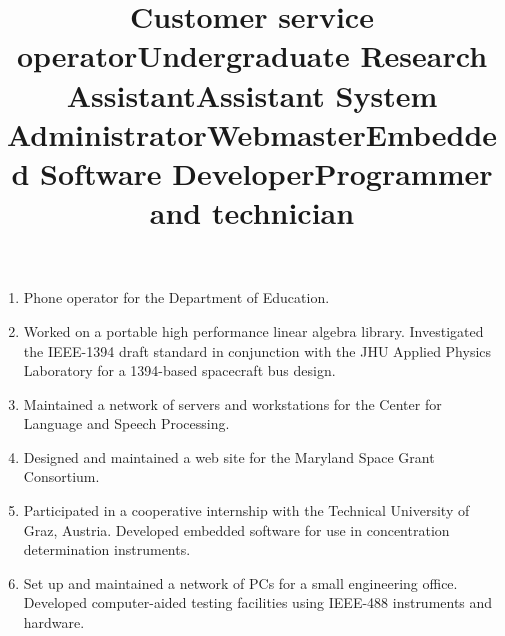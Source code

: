 \documentclass[line]{res}
\begin{document}
\begin{resume}
\begin{enumerate}
		\item {} 
		\title{Customer service operator} 
		  
		\begin{position}
			Phone operator for the Department of Education. 
		\end{position}
		
		\item {} 
		\title{Undergraduate Research Assistant} 
		  
		\begin{position}
			Worked on a portable high performance linear algebra library. Investigated the IEEE-1394 draft standard in conjunction with the JHU Applied Physics Laboratory for a 1394-based spacecraft bus design. 
		\end{position}
		
		\item 
		\title{Assistant System Administrator} 
		\begin{position}
			Maintained a network of servers and workstations for the Center for Language and Speech Processing. 
		\end{position}
		
		\item 
		\title{Webmaster} 
		\begin{position}
			Designed and maintained a web site for the Maryland Space Grant Consortium. 
		\end{position}
		
		\item {} 
		\title{Embedded Software Developer} 
		  
		\begin{position}
			Participated in a cooperative internship with the Technical University of Graz, Austria. Developed embedded software for use in concentration determination instruments. 
		\end{position}
		
		\item {} 
		\title{Programmer and technician} 
		  
		\begin{position}
			Set up and maintained a network of PCs for a small engineering office. Developed computer-aided testing facilities using IEEE-488 instruments and hardware. 
		\end{position}
	\end{enumerate}
	

\end{resume}
\end{document}
